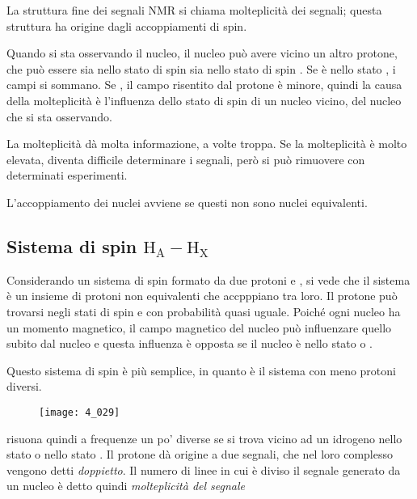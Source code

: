 La struttura fine dei segnali NMR si chiama molteplicità dei segnali; questa struttura ha origine dagli  accoppiamenti di spin.

Quando si sta osservando il nucleo, il nucleo può avere vicino un altro protone, che può essere sia nello stato di spin \alpha{} sia nello stato di spin \beta{}. Se è nello stato \alpha{}, i campi si sommano. Se \beta{}, il campo risentito dal protone è minore, quindi la causa della molteplicità è l'influenza dello stato di spin di un nucleo vicino, del nucleo che si sta osservando.

La molteplicità dà molta informazione, a volte troppa. Se la molteplicità è molto elevata, diventa difficile determinare i segnali, però si può rimuovere con determinati esperimenti.

L'accoppiamento dei nuclei avviene se questi non sono nuclei equivalenti.

\subsection{Sistema di spin $\text{H}_{\text{A}} - \text{H}_{\text{X}}$}

Considerando un sistema di spin formato da due protoni  e , si vede che il sistema è un insieme di protoni non equivalenti che accpppiano tra loro. Il protone  può trovarsi negli stati di spin \alpha{} e \beta{} con probabilità quasi uguale. Poiché ogni nucleo ha un momento magnetico, il campo magnetico del nucleo  può influenzare quello subito dal nucleo  e questa influenza è opposta se il nucleo  è nello stato \alpha{} o \beta{}.

Questo sistema di spin è più semplice, in quanto è il sistema con meno protoni diversi.

\begin{figure}[H]
  \texttt{[image: 4\_029]}
\end{figure}

 risuona quindi a frequenze un po' diverse se si trova vicino ad un idrogeno  nello stato \alpha{} o nello stato \beta{}.
Il protone  dà origine a due segnali, che nel loro complesso vengono detti \emph{doppietto}. Il numero di linee in cui è diviso il segnale generato da un nucleo è detto quindi \emph{molteplicità del segnale}


